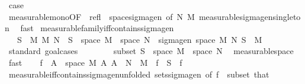 \begin{isabellebody}
\ {\isacharquery}{\kern0pt}case\ \isamarkupfalse%
\ measurable{\isacharunderscore}{\kern0pt}mono{\isacharbrackleft}{\kern0pt}OF\ {\isacharunderscore}{\kern0pt}\ refl\ {\isacharunderscore}{\kern0pt}\ space{\isacharunderscore}{\kern0pt}sigma{\isacharunderscore}{\kern0pt}gen{\isacharcomma}{\kern0pt}\ of\ N\ M{\isacharbrackright}{\kern0pt}\ measurable{\isacharunderscore}{\kern0pt}sigma{\isacharunderscore}{\kern0pt}gen{\isacharunderscore}{\kern0pt}singleton\ \isamarkupfalse%
\ fast\isanewline
{}\isamarkupfalse%
%
\endisatagproof
{\isafoldproof}%
%
\isadelimproof
\isanewline
%
\endisadelimproof
\isanewline
{}\isamarkupfalse%
\ measurable{\isacharunderscore}{\kern0pt}family{\isacharunderscore}{\kern0pt}iff{\isacharunderscore}{\kern0pt}contains{\isacharunderscore}{\kern0pt}sigma{\isacharunderscore}{\kern0pt}gen{\isacharcolon}{\kern0pt}\isanewline
\ \ \ {\isachardoublequoteopen}{\isacharparenleft}{\kern0pt}S\ {\isasymsubseteq}\ M\ {\isasymrightarrow}\isactrlsub M\ N{\isacharparenright}{\kern0pt}\ {\isasymlongleftrightarrow}\ S\ {\isasymsubseteq}\ space\ M\ {\isasymrightarrow}\ space\ N\ {\isasymand}\ sigma{\isacharunderscore}{\kern0pt}gen\ {\isacharparenleft}{\kern0pt}space\ M{\isacharparenright}{\kern0pt}\ N\ S\ {\isasymsubseteq}\ M{\isachardoublequoteclose}\isanewline
%
\isadelimproof
%
\endisadelimproof
%
\isatagproof
{}\isamarkupfalse%
\ {\isacharparenleft}{\kern0pt}standard{\isacharcomma}{\kern0pt}\ goal{\isacharunderscore}{\kern0pt}cases{\isacharparenright}{\kern0pt}\isanewline
\ \ \isamarkupfalse%
\ {}\isanewline
\ \ \isamarkupfalse%
\ subset{\isacharcolon}{\kern0pt}\ {\isachardoublequoteopen}S\ {\isasymsubseteq}\ space\ M\ {\isasymrightarrow}\ space\ N{\isachardoublequoteclose}\ \isamarkupfalse%
\ measurable{\isacharunderscore}{\kern0pt}space\ \isamarkupfalse%
\ fast\isanewline
\ \ \isamarkupfalse%
\ {\isachardoublequoteopen}{\isacharbraceleft}{\kern0pt}f\ {\isacharminus}{\kern0pt}{\isacharbackquote}{\kern0pt}\ A\ {\isasyminter}\ space\ M\ {\isacharbar}{\kern0pt}A{\isachardot}{\kern0pt}\ A\ {\isasymin}\ N{\isacharbraceright}{\kern0pt}\ {\isasymsubseteq}\ M{\isachardoublequoteclose}\ \ {\isachardoublequoteopen}f\ {\isasymin}\ S{\isachardoublequoteclose}\ \ f\ \isamarkupfalse%
\ measurable{\isacharunderscore}{\kern0pt}iff{\isacharunderscore}{\kern0pt}contains{\isacharunderscore}{\kern0pt}sigma{\isacharunderscore}{\kern0pt}gen{\isacharbrackleft}{\kern0pt}unfolded\ sets{\isacharunderscore}{\kern0pt}sigma{\isacharunderscore}{\kern0pt}gen{\isacharcomma}{\kern0pt}\ of\ f{\isacharbrackright}{\kern0pt}\ {}\ subset\ that\ \isamarkupfalse%

\end{isabellebody}
